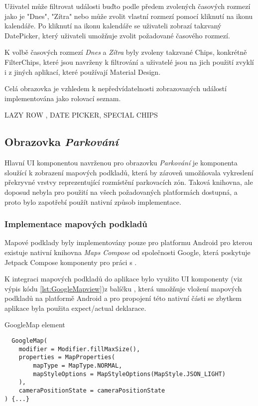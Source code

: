 Uživatel může filtrovat události buďto podle předem zvolených časových rozmezí jako je "Dnes", "Zítra" nebo může zvolit vlastní 
rozmezí pomocí kliknutí na ikonu kalendáře. Po kliknutí na ikonu kalendáře se uživateli zobrazí takzvaný DatePicker, který 
uživateli umožňuje zvolit požadované časového rozmezí.

K volbě časových rozmezí \textit{Dnes} a \textit{Zítra} byly zvoleny takzvané Chips, konkrétně FilterChips, které jsou navrženy k 
filtrování a uživatelé jsou na jich použití zvyklí i z jiných aplikací, které používají Material Design.

Celá obrazovka je vzhledem k nepředvídatelnosti zobrazovaných událostí implementována jako rolovací seznam.

LAZY ROW , DATE PICKER, SPECIAL CHIPS


\subsection{Obrazovka \textit{Parkování}} \label{parkingScreenImpl}
Hlavní UI komponentou navrženou pro obrazovku \textit{Parkování} je komponenta sloužící k zobrazení mapových podkladů, která by zároveň umožňovala 
vykreslení překryvné vrstvy reprezentující rozmístění parkovacích zón. Taková knihovna, ale doposud nebyla pro použití na všech požadovaných 
platformách dostupná, a proto bylo zapotřebí použít nativní způsob implementace. 

\subsubsection*{Implementace mapových podkladů}
Mapové podklady byly implementovány pouze pro platformu Android pro kterou existuje nativní knihovna \textit{Maps Compose} od společnosti Google, 
která poskytuje Jetpack Compose komponenty pro práci s .

K integraci mapových podkladů do aplikace bylo využito UI komponenty  (viz výpis kódu \ref{lst:GoogleMapview})z balíčku 
, která umožňuje vložení mapových podkladů na platformě Android a pro propojení této nativní části 
se zbytkem aplikace byla použita expect/actual deklarace.


\begin{listing}[H]
\caption{GoogleMap element}\label{lst:GoogleMapview}
\begin{verbatim}
  GoogleMap(
    modifier = Modifier.fillMaxSize(),
    properties = MapProperties(
        mapType = MapType.NORMAL,
        mapStyleOptions = MapStyleOptions(MapStyle.JSON_LIGHT)
    ),
    cameraPositionState = cameraPositionState
) {...}
\end{verbatim}
\end{listing}


